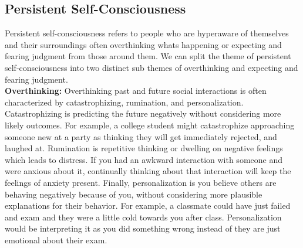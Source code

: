 \documentclass[twoside]{report}
\begin{document}
\subsection{Persistent Self-Consciousness}
Persistent self-consciousness refers to people who are hyperaware of themselves and their surroundings often overthinking whats happening or expecting and fearing judgment from those around them. We can split the theme of persistent self-consciousness into two distinct sub themes of overthinking and expecting and fearing judgment.\\

\textbf{Overthinking:} Overthinking past and future social interactions is often characterized by catastrophizing, rumination, and personalization. Catastrophizing is predicting the future negatively without considering more likely outcomes. For example, a college student might catastrophize approaching someone new at a party as thinking they will get immediately rejected, and laughed at. Rumination is repetitive thinking or dwelling on negative feelings which leads to distress. If you had an awkward interaction with someone and were anxious about it, continually thinking about that interaction will keep the feelings of anxiety present. Finally, personalization is you believe others are behaving negatively because of you, without considering more plausible explanations for their behavior. For example, a classmate could have just failed and exam and they were a little cold towards you after class. Personalization would be interpreting it as you did something wrong instead of they are just emotional about their exam. \\
\end{document}
